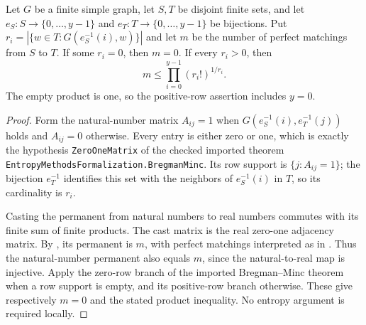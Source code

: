 \begin{lemma}
Let $G$ be a finite simple graph, let $S,T$ be disjoint finite sets, and
let $e_S:S\to\{0,\ldots,y-1\}$ and $e_T:T\to\{0,\ldots,y-1\}$ be
bijections. Put $r_i=|\{w\in T:G(e_S^{-1}(i),w)\}|$ and let $m$ be
the number of perfect matchings from $S$ to $T$. If some $r_i=0$, then
$m=0$. If every $r_i>0$, then
\[
 m\le\prod_{i=0}^{y-1}(r_i!)^{1/r_i}.
\]
The empty product is one, so the positive-row assertion includes $y=0$.
\end{lemma}
\begin{proof}
Form the natural-number matrix $A_{ij}=1$ when
$G(e_S^{-1}(i),e_T^{-1}(j))$ holds and $A_{ij}=0$ otherwise.
Every entry is either zero or one, which is exactly the hypothesis
\texttt{ZeroOneMatrix} of the checked imported theorem
\texttt{EntropyMethodsFormalization.BregmanMinc}. Its row support is
$\{j:A_{ij}=1\}$; the bijection $e_T^{-1}$ identifies this set with the
neighbors of $e_S^{-1}(i)$ in $T$, so its cardinality is $r_i$.

Casting the permanent from natural numbers to real numbers commutes with
its finite sum of finite products. The cast matrix is the real zero-one
adjacency matrix. By , its
permanent is $m$, with perfect matchings interpreted as in
. Thus the natural-number permanent also equals
$m$, since the natural-to-real map is injective. Apply the zero-row branch
of the imported Bregman--Minc theorem when a row support is empty, and
its positive-row branch otherwise. These give respectively $m=0$ and
the stated product inequality. No entropy argument is required locally.
\end{proof}
